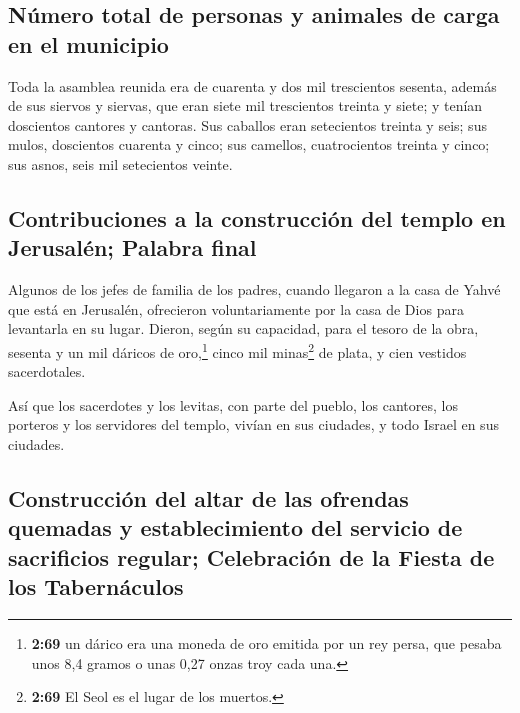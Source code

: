 \hypertarget{nuxfamero-total-de-personas-y-animales-de-carga-en-el-municipio}{%
\subsection{Número total de personas y animales de carga en el
municipio}\label{nuxfamero-total-de-personas-y-animales-de-carga-en-el-municipio}}

 Toda la asamblea reunida era de cuarenta y dos mil
trescientos sesenta,  además de sus siervos y siervas,
que eran siete mil trescientos treinta y siete; y tenían doscientos
cantores y cantoras.  Sus caballos eran setecientos
treinta y seis; sus mulos, doscientos cuarenta y cinco; 
sus camellos, cuatrocientos treinta y cinco; sus asnos, seis mil
setecientos veinte.

\hypertarget{contribuciones-a-la-construcciuxf3n-del-templo-en-jerusaluxe9n-palabra-final}{%
\subsection{Contribuciones a la construcción del templo en Jerusalén;
Palabra
final}\label{contribuciones-a-la-construcciuxf3n-del-templo-en-jerusaluxe9n-palabra-final}}

 Algunos de los jefes de familia de los padres, cuando
llegaron a la casa de Yahvé que está en Jerusalén, ofrecieron
voluntariamente por la casa de Dios para levantarla en su lugar.
 Dieron, según su capacidad, para el tesoro de la obra,
sesenta y un mil dáricos de oro,\footnote{\textbf{2:69} un dárico era
  una moneda de oro emitida por un rey persa, que pesaba unos 8,4 gramos
  o unas 0,27 onzas troy cada una.} cinco mil minas\footnote{\textbf{2:69}
  El Seol es el lugar de los muertos.} de plata, y cien vestidos
sacerdotales.

 Así que los sacerdotes y los levitas, con parte del
pueblo, los cantores, los porteros y los servidores del templo, vivían
en sus ciudades, y todo Israel en sus ciudades.

\hypertarget{construcciuxf3n-del-altar-de-las-ofrendas-quemadas-y-establecimiento-del-servicio-de-sacrificios-regular-celebraciuxf3n-de-la-fiesta-de-los-tabernuxe1culos}{%
\subsection{Construcción del altar de las ofrendas quemadas y
establecimiento del servicio de sacrificios regular; Celebración de la
Fiesta de los
Tabernáculos}\label{construcciuxf3n-del-altar-de-las-ofrendas-quemadas-y-establecimiento-del-servicio-de-sacrificios-regular-celebraciuxf3n-de-la-fiesta-de-los-tabernuxe1culos}}

